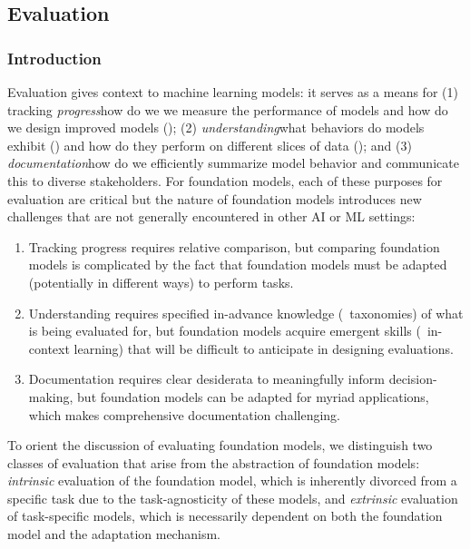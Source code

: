 \newsection
\subsection{Evaluation}
\label{sec:evaluation}

\subsubsection{Introduction}
\label{sec:evaluation-introduction}
Evaluation gives context to machine learning models: it serves as a means for (1) tracking \textit{progress}\dash{}how do we we measure the performance of models and how do we design improved models (); (2) \textit{understanding}\dash{}what behaviors do models exhibit () and how do they perform on different slices of data (); and (3) \textit{documentation}\dash{}how do we efficiently summarize model behavior and communicate this to diverse stakeholders. 
For foundation models, each of these purposes for evaluation are critical but the nature of foundation models introduces new challenges that are not generally encountered in other AI or ML settings: 
\begin{enumerate}
    \item Tracking progress requires relative comparison, but comparing foundation models is complicated by the fact that foundation models must be adapted (potentially in different ways) to perform tasks.
    \item Understanding requires specified in-advance knowledge (\eg~taxonomies) of what is being evaluated for, but foundation models acquire emergent skills (\eg~in-context learning) that will be difficult to anticipate in designing evaluations.
    \item Documentation requires clear desiderata to meaningfully inform decision-making, but foundation models can be adapted for myriad applications, which makes comprehensive documentation challenging.
\end{enumerate}
To orient the discussion of evaluating foundation models, we distinguish two classes of evaluation that arise from the abstraction of foundation models: \textit{intrinsic} evaluation of the foundation model, which is inherently divorced from a specific task due to the task-agnosticity of these models, and \textit{extrinsic} evaluation of task-specific models, which is necessarily dependent on both the foundation model and the adaptation mechanism.
